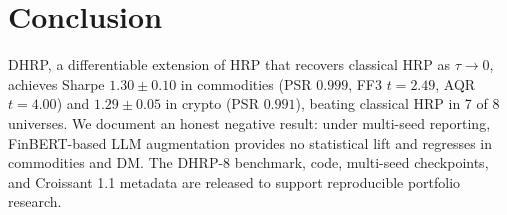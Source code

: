 \section{Conclusion}
\label{sec:conclusion}

DHRP, a differentiable extension of HRP that recovers classical HRP as
$\tau \to 0$, achieves Sharpe $1.30 \pm 0.10$ in commodities (PSR
$0.999$, FF3 $t{=}2.49$, AQR $t{=}4.00$) and $1.29 \pm 0.05$ in crypto
(PSR $0.991$), beating classical HRP in 7 of 8 universes. We document
an honest negative result: under multi-seed reporting, FinBERT-based
LLM augmentation provides no statistical lift and regresses in
commodities and DM. The DHRP-8 benchmark, code, multi-seed
checkpoints, and Croissant 1.1 metadata are released to support
reproducible portfolio research.
